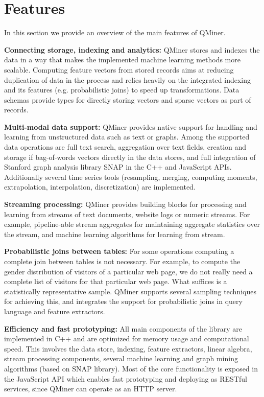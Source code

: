 \documentclass{article} %
\begin{document}
\section{Features}
In this section we provide an overview of the main features of QMiner.

\textbf{Connecting storage, indexing and analytics:} QMiner stores and indexes the data in a way that makes the implemented machine learning methods more scalable. Computing feature vectors from stored records aims at reducing duplication of data in the process and relies heavily on the integrated indexing and its features (e.g. probabilistic joins) to speed up transformations. Data schemas provide types for directly storing vectors and sparse vectors as part of records.

\textbf{Multi-modal data support:} QMiner provides native support for handling and learning from unstructured data such as text or graphs. Among the supported data operations are full text search, aggregation over text fields, creation and storage if bag-of-words vectors directly in the data stores, and full integration of Stanford graph analysis library SNAP \cite{snap} in the C++ and JavaScript APIs. Additionally several time series tools (resampling, merging, computing moments, extrapolation, interpolation, discretization) are implemented.

\textbf{Streaming processing:} QMiner provides building blocks for processing and learning from streams of text documents, website logs or numeric streams. For example, pipeline-able stream aggregates for maintaining aggregate statistics over the stream, and machine learning algorithms for learning from stream.

\textbf{Probabilistic joins between tables:} For some operations computing a complete join between tables is not necessary. For example, to compute the gender distribution of visitors of a particular web page, we do not really need a complete list of visitors for that particular web page. What suffices is a statistically representative sample. QMiner supports several sampling techniques for achieving this, and integrates the support for probabilistic joins in query language and feature extractors.

\textbf{Efficiency and fast prototyping:} All main components of the library are implemented in C++ and are optimized for memory usage and computational speed. This involves the data store, indexing, feature extractors, linear algebra, stream processing components, several machine learning and graph mining algorithms (based on SNAP library). Most of the core functionality is exposed in the JavaScript API which enables fast prototyping and deploying as RESTful services, since
QMiner can operate as an HTTP server.
\end{document}
